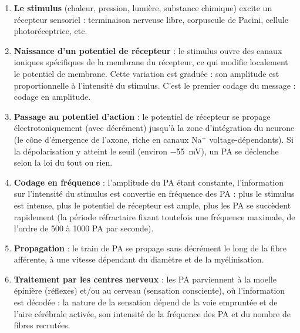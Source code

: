 \documentclass[11pt]{article}
\newcommand{\cle}[1]{{\popxbold\color{popdark}#1}}
\begin{document}
\begin{enumerate}
\item \textbf{Le stimulus} (chaleur, pression, lumière, substance chimique) excite un \cle{récepteur sensoriel} : terminaison nerveuse libre, corpuscule de Pacini, cellule photoréceptrice, etc.
\item \textbf{Naissance d'un potentiel de récepteur} : le stimulus ouvre des canaux ioniques spécifiques de la membrane du récepteur, ce qui modifie localement le potentiel de membrane. Cette variation est \cle{graduée} : son amplitude est proportionnelle à l'intensité du stimulus. C'est le premier \cle{codage} du message : codage en amplitude.
\item \textbf{Passage au potentiel d'action} : le potentiel de récepteur se propage électrotoniquement (avec décrément) jusqu'à la zone d'intégration du neurone (le cône d'émergence de l'axone, riche en canaux Na$^+$ voltage-dépendants). Si la dépolarisation y atteint le \cle{seuil} (environ \SI{-55}{mV}), un PA se déclenche selon la loi du \cle{tout ou rien}.
\item \textbf{Codage en fréquence} : l'amplitude du PA étant constante, l'information sur l'intensité du stimulus est convertie en \cle{fréquence} des PA : plus le stimulus est intense, plus le potentiel de récepteur est ample, plus les PA se succèdent rapidement (la période réfractaire fixant toutefois une fréquence maximale, de l'ordre de 500 à 1000 PA par seconde).
\item \textbf{Propagation} : le train de PA se propage sans décrément le long de la fibre afférente, à une vitesse dépendant du diamètre et de la myélinisation.
\item \textbf{Traitement par les centres nerveux} : les PA parviennent à la moelle épinière (réflexes) et/ou au cerveau (sensation consciente), où l'information est décodée : la nature de la sensation dépend de la voie empruntée et de l'aire cérébrale activée, son intensité de la fréquence des PA et du nombre de fibres recrutées.
\end{enumerate}
\end{document}
